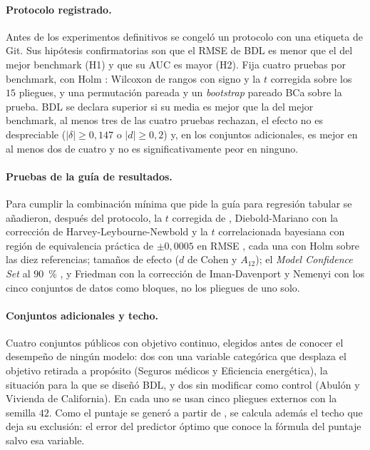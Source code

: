 \paragraph{Protocolo registrado.}
Antes de los experimentos definitivos se congeló un protocolo con una etiqueta de Git. Sus hipótesis confirmatorias
son que el RMSE de BDL es menor que el del mejor benchmark (H1) y que su AUC es mayor (H2). Fija cuatro pruebas por
benchmark, con Holm \citep{holm1979}: Wilcoxon de rangos con signo y la $t$ corregida sobre los $15$ pliegues, y una
permutación pareada y un \emph{bootstrap} pareado BCa sobre la prueba. BDL se declara superior si su media es mejor
que la del mejor benchmark, al menos tres de las cuatro pruebas rechazan, el efecto no es despreciable ($|\delta| \ge
0{,}147$ o $|d| \ge 0{,}2$) y, en los conjuntos adicionales, es mejor en al menos dos de cuatro y no es
significativamente peor en ninguno.

\paragraph{Pruebas de la guía de resultados.}
Para cumplir la combinación mínima que pide la guía para regresión tabular se añadieron, después del protocolo, la
$t$ corregida de \citet{nadeau2003}, Diebold-Mariano con la corrección de Harvey-Leybourne-Newbold
\citep{diebold1995,harvey1997} y la $t$ correlacionada bayesiana con región de equivalencia práctica de $\pm 0{,}0005$ en
RMSE \citep{benavoli2017}, cada una con Holm sobre las diez referencias; tamaños de efecto ($d$ de Cohen y $A_{12}$);
el \emph{Model Confidence Set} al $90$~\% \citep{hansen2011mcs}, y Friedman con la corrección de Iman-Davenport y
Nemenyi \citep{demsar2006} con los cinco conjuntos de datos como bloques, no los pliegues de uno solo.

\paragraph{Conjuntos adicionales y techo.}
Cuatro conjuntos públicos con objetivo continuo, elegidos antes de conocer el desempeño de ningún modelo: dos con una
variable categórica que desplaza el objetivo retirada a propósito (Seguros médicos y Eficiencia energética), la
situación para la que se diseñó BDL, y dos sin modificar como control (Abulón y Vivienda de California). En cada uno
se usan cinco pliegues externos con la semilla $42$. Como el puntaje se generó a partir de \ap, se calcula además el
techo que deja su exclusión: el error del predictor óptimo que conoce la fórmula del puntaje salvo esa variable.

